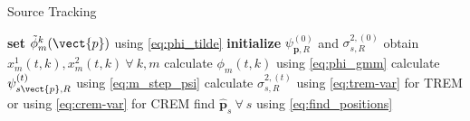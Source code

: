 \begin{algorithm}[H]
\caption{Source Tracking}
\label{alg:sourceTracking}
\begin{algorithmic}
\State \textbf{set} $\tilde\phi^k_m(\vect{p})$ using \eqref{eq:phi_tilde}
\State \textbf{initialize} $\psi_{\bm p, R}^{(0)}$ and $\sigma_{s,R}^{2,(0)}$
\State obtain $x_m^1(t,k), x_m^2(t,k)\ \forall\ k,m$
\State calculate $\phi_m(t,k)$ using \eqref{eq:phi_gmm}
\State calculate $\psi^{(t)}_{s\vect{p},R}$ using \eqref{eq:m_step_psi}
\State calculate $\sigma^{2,(t)}_{s,R}$ using \eqref{eq:trem-var} for TREM or using \eqref{eq:crem-var} for CREM
\State find $\hat{\bm p}_s\ \forall\ s$ using \eqref{eq:find_positions}
\EndFor
\end{algorithmic}
\end{algorithm}